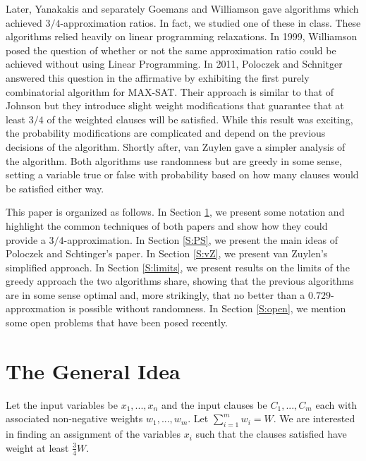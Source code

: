 \documentclass[11pt,letter]{article}
\numberwithin{theorem}{section}
\begin{document}
Later, Yanakakis \cite{Yannakakis1994475} and separately Goemans and Williamson \cite{Goemans94new3/4-approximation}
gave algorithms which achieved $3/4$-approximation ratios. In fact, we studied one of these in class.
These algorithms relied heavily on linear programming relaxations. In 1999, Williamson posed the question
of whether or not the same approximation ratio could be achieved without using Linear Programming. In 2011,
Poloczek and Schnitger \cite{Poloczek:2011:RVJ:2133036.2133087} answered this question in the affirmative
by exhibiting the first purely combinatorial algorithm for MAX-SAT. Their approach is similar to that of Johnson
but they introduce slight weight modifications that guarantee that at least $3/4$ of the weighted clauses will be satisfied.
While this result was exciting, the probability modifications are complicated and depend on the previous decisions
of the algorithm. Shortly after, van Zuylen \cite{vanZuylen:2011:SAM:2238496.2238512} gave a simpler analysis of the algorithm.
Both algorithms use randomness but are greedy in some sense,
setting a variable true or false with probability based on
how many clauses would be satisfied either way.

This paper is organized as follows.
In Section \ref{S:idea}, we present some notation and highlight the common techniques of both papers
and show how they could provide a $3/4$-approximation.
In Section \ref{S:PS}, we present the main ideas of Poloczek and Schtinger's paper.
In Section \ref{S:vZ}, we present van Zuylen's simplified approach.
In Section \ref{S:limits}, we present results on the limits of
the greedy approach the two algorithms share,
showing that the previous algorithms are in some sense optimal
and, more strikingly,
that no better than a $0.729$-approxmation is possible without randomness.
In Section \ref{S:open}, we mention some open problems that have been posed recently.


\section{The General Idea}\label{S:idea}

Let the input variables be $x_1,...,x_n$ and the input clauses be $C_1,...,C_m$
each with associated non-negative weights $w_1,...,w_m$. Let $\sum_{i=1}^{m} w_i = W$.
We are interested in finding an assignment of the variables $x_i$ such that the clauses satisfied have weight at least $\frac{3}{4}W$.
\end{document}
